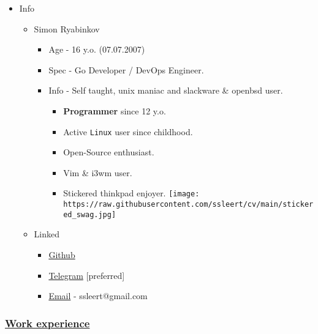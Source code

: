 \begin{itemize}
\tightlist
\item
  Info

  \begin{itemize}
  \tightlist
  \item
    Simon Ryabinkov

    \begin{itemize}
    \tightlist
    \item
      Age - 16 y.o. (07.07.2007)
    \item
      Spec - Go Developer / DevOps Engineer.
    \item
      Info - Self taught, unix maniac and slackware \& openbsd user.

      \begin{itemize}
      \tightlist
      \item
        \label{Ryabinkovux20Semyonux20Pavlovich-Main-Programmer}{}\textbf{Programmer}
        since 12 y.o.
      \item
        Active \texttt{Linux} user since childhood.
      \item
        Open-Source enthusiast.
      \item
        Vim \& i3wm user.
      \item
        Stickered thinkpad enjoyer.
        \texttt{[image: https://raw.githubusercontent.com/ssleert/cv/main/stickered\_swag.jpg]}
      \end{itemize}
    \end{itemize}
  \item
    Linked

    \begin{itemize}
    \tightlist
    \item
      \href{https://github.com/ssleert}{Github}
    \item
      \href{https://t.me/ssleert}{Telegram} {[}preferred{]}
    \item
      \href{mailto:ssleert@gmail.com}{Email} - ssleert@gmail.com
    \end{itemize}
  \end{itemize}
\end{itemize}

\label{Ryabinkovux20Semyonux20Pavlovich-Workux20experience}
\subsubsection{\texorpdfstring{\hyperref[Ryabinkovux5cux2520Semyonux5cux2520Pavlovich-Workux5cux2520experience]{Work
experience}}{Work experience}}\label{Workux20experience}

